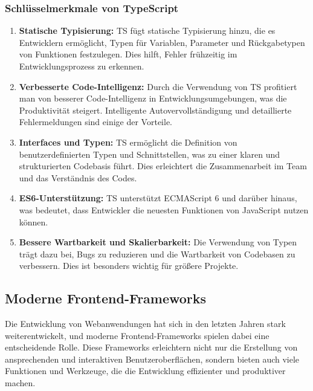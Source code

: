 \subsubsection{Schlüsselmerkmale von TypeScript}

\begin{enumerate}
    \item \textbf{Statische Typisierung:} \acl{TS} fügt statische Typisierung hinzu, die es Entwicklern ermöglicht, Typen für Variablen, Parameter und Rückgabetypen von Funktionen festzulegen. Dies hilft, Fehler frühzeitig im Entwicklungsprozess zu erkennen.

    \item \textbf{Verbesserte Code-Intelligenz:} Durch die Verwendung von \acl{TS} profitiert man von besserer Code-Intelligenz in Entwicklungsumgebungen, was die Produktivität steigert. Intelligente Autovervollständigung und detaillierte Fehlermeldungen sind einige der Vorteile.

    \item \textbf{Interfaces und Typen:} \acl{TS} ermöglicht die Definition von benutzerdefinierten Typen und Schnittstellen, was zu einer klaren und strukturierten Codebasis führt. Dies erleichtert die Zusammenarbeit im Team und das Verständnis des Codes.

    \item \textbf{ES6-Unterstützung:} \acl{TS} unterstützt ECMAScript 6 und darüber hinaus, was bedeutet, dass Entwickler die neuesten Funktionen von JavaScript nutzen können.

    \item \textbf{Bessere Wartbarkeit und Skalierbarkeit:} Die Verwendung von Typen trägt dazu bei, Bugs zu reduzieren und die Wartbarkeit von Codebasen zu verbessern. Dies ist besonders wichtig für größere Projekte.
\end{enumerate}

\subsection{Moderne Frontend-Frameworks}
\label{chapter:3-frontend-frameworks}

Die Entwicklung von Webanwendungen hat sich in den letzten Jahren stark weiterentwickelt, und moderne Frontend-Frameworks spielen dabei eine entscheidende Rolle. Diese Frameworks erleichtern nicht nur die Erstellung von ansprechenden und interaktiven Benutzeroberflächen, sondern bieten auch viele Funktionen und Werkzeuge, die die Entwicklung effizienter und produktiver machen.

